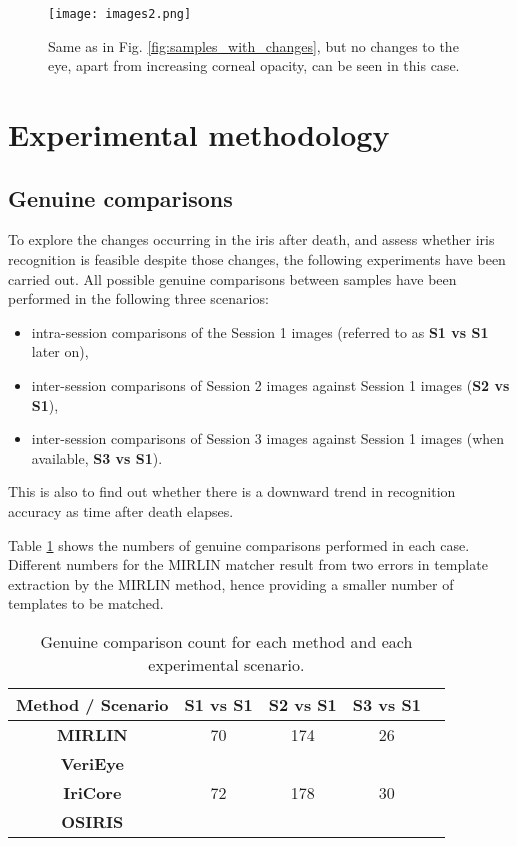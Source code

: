\documentclass[10pt,twocolumn,letterpaper]{article}
\begin{document}
\begin{figure}[!t]
\centering
\texttt{[image: images2.png]}
\caption{Same as in Fig. \ref{fig:samples_with_changes}, but no changes to the eye, apart from increasing corneal opacity, can be seen in this case.}
\label{fig:samples_without_changes}
\end{figure}


\section{Experimental methodology}

\subsection{Genuine comparisons}

To explore the changes occurring in the iris after death, and assess whether iris recognition is feasible despite those changes, the following experiments have been carried out. All possible genuine comparisons between samples have been performed in the following three scenarios:
\begin{itemize}
	\item intra-session comparisons of the Session 1 images (referred to as \textbf{S1 vs S1} later on),
	\item inter-session comparisons of Session 2 images against Session 1 images (\textbf{S2 vs S1}),
	\item inter-session comparisons of Session 3 images against Session 1 images (when available, \textbf{S3 vs S1}).
\end{itemize}

This is also to find out whether there is a downward trend in recognition accuracy as time after death elapses. 

Table \ref{table:comparisons} shows the numbers of genuine comparisons performed in each case. Different numbers for the MIRLIN matcher result from two errors in template extraction by the MIRLIN method, hence providing a smaller number of templates to be matched.

\begin{table}[!ht]
\renewcommand{\arraystretch}{1.1}
\caption{Genuine comparison count for each method and each experimental scenario.}
\label{table:comparisons}
\centering\footnotesize
\begin{tabular}[t]{|c|c|c|c|c|}
\hline
\textbf{Method / Scenario} & \textbf{S1 vs S1} & \textbf{S2 vs S1} & \textbf{S3 vs S1} \\
\hline
\hline
\textbf{MIRLIN} & 70 & 174 & 26 \\
\hline
\textbf{VeriEye} & & & \\
\textbf{IriCore} & 72 & 178 & 30 \\
\textbf{OSIRIS} & & & \\
\hline
\end{tabular}
\end{table}
\end{document}
